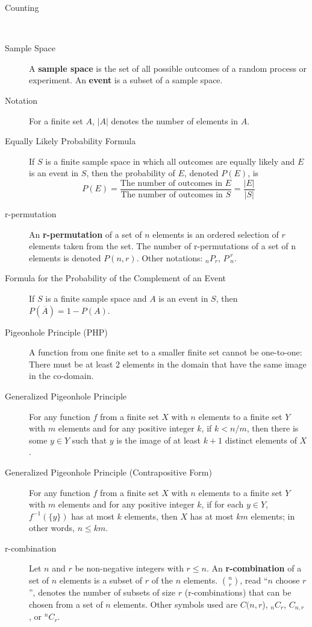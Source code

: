 \documentclass{article}
\begin{document}
\begin{description}
	\vspace{0.2cm}
    \item[\large Counting]\
    \item[Sample Space] A \textbf{sample space} is the set of all possible outcomes of a random process or experiment. An \textbf{event} is a subset of a sample space.
   \item[Notation]For a finite set $A$, $|A|$ denotes the number of elements in $A$.
   \item[Equally Likely Probability Formula] If $S$ is a finite sample space in which all outcomes are equally likely and $E$ is an event in $S$, then the probability of $E$, denoted $P(E)$, is \[P(E) = \frac{\text{The number of outcomes in }E}{\text{The number of outcomes in }S}=\frac{|E|}{|S|}\]
   \item[r-permutation] An \textbf{r-permutation} of a set of $n$ elements is an ordered
selection of $r$ elements taken from the set. The number of r-permutations of a set of n elements
is denoted $P(n, r)$. Other notations: $_{n}P_{r}$, $P_{\;n}^{\;r}$.
\item[Formula for the Probability of the Complement of an Event]If $S$ is a finite sample space and $A$ is an event in $S$, then $P(\overline{A}) = 1-P(A)$.
	\item[Pigeonhole Principle (PHP)] A function from one finite set to a smaller finite set cannot be one-to-one: There must be at least 2 elements in the domain that have the same image in the co-domain.
	\item[Generalized Pigeonhole Principle]For any function $f$ from a finite set $X$ with $n$ elements to a finite set $Y$ with $m$ elements and for any positive integer $k$, if $k < n/m$, then there is some $y\in Y$ such that $y$ is the image of at least $k + 1$ distinct elements of $X$.
	\item[Generalized Pigeonhole Principle (Contrapositive Form)]For any function $f$ from a finite set $X$ with $n$ elements to a finite set $Y$ with $m$ elements and for any positive integer $k$, if for each $y\in Y$, $f^{-1}(\{y\})$ has at most $k$ elements, then $X$ has at most $km$ elements; in other words, $n\leq km$.
	\item[r-combination] Let $n$ and $r$ be non-negative integers with $r\leq n$.
An \textbf{r-combination} of a set of $n$ elements is a subset of $r$ of the $n$ elements. ${n\choose r}$, read “$n$ choose $r$”, denotes the number of subsets of size $r$ (r-combinations) that can be chosen from a set of $n$ elements. Other symbols used are $C(n, r$), $_{n}C_{r}$, $C_{n,r}$ , or $^{n}C_{r}$.

\end{description}
\end{document}
